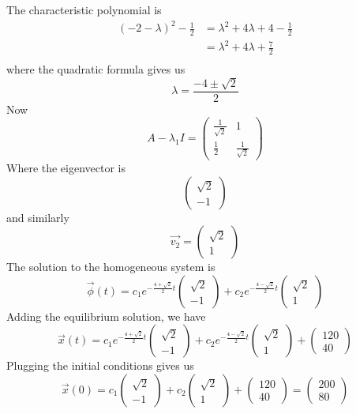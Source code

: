 \documentclass[12pt]{article}
\begin{document}
The characteristic polynomial is
\begin{align*}
	(-2-\lambda)^2 - \frac{1}{2} &= \lambda^2 + 4\lambda + 4 - \frac{1}{2} \\
				     &= \lambda^2 + 4\lambda + \frac{7}{2} \\
\end{align*}
where the quadratic formula gives us
$$\lambda = \frac{-4\pm\sqrt{2}}{2}$$
Now
$$A - \lambda_1I = \begin{pmatrix} \frac{1}{\sqrt{2}} & 1 \\ \frac{1}{2} & \frac{1}{\sqrt{2}} \end{pmatrix}$$
Where the eigenvector is
$$\begin{pmatrix} \sqrt{2} \\ -1 \end{pmatrix}$$
and similarly
$$\vec{v_2} = \begin{pmatrix} \sqrt{2} \\ 1\end{pmatrix}$$
The solution to the homogeneous system is
$$\vec{\phi}(t) = c_1e^{-\frac{4+\sqrt{2}}{2}t} \begin{pmatrix} \sqrt{2} \\ -1 \end{pmatrix} + c_2e^{-\frac{4-\sqrt{2}}{2}t} \begin{pmatrix} \sqrt{2} \\ 1 \end{pmatrix}$$
Adding the equilibrium solution, we have
$$\vec{x}(t) = c_1e^{-\frac{4+\sqrt{2}}{2}t} \begin{pmatrix} \sqrt{2} \\ -1 \end{pmatrix} + c_2e^{-\frac{4-\sqrt{2}}{2}t} \begin{pmatrix} \sqrt{2} \\ 1 \end{pmatrix} + \begin{pmatrix} 120 \\ 40 \end{pmatrix}$$
Plugging the initial conditions gives us
$$\vec{x}(0) = c_1\begin{pmatrix} \sqrt{2} \\ -1 \end{pmatrix} + c_2 \begin{pmatrix} \sqrt{2} \\ 1 \end{pmatrix} + \begin{pmatrix} 120 \\ 40 \end{pmatrix} = \begin{pmatrix} 200 \\ 80 \end{pmatrix}$$
\end{document}
